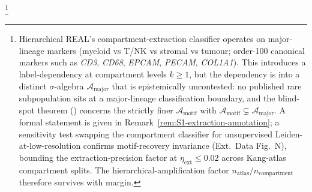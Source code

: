 
\footnote{
Hierarchical REAL's compartment-extraction classifier operates on major-lineage markers (myeloid vs T/NK vs stromal vs tumour; order-100 canonical markers such as \textit{CD3}, \textit{CD68}, \textit{EPCAM}, \textit{PECAM}, \textit{COL1A1}). This introduces a label-dependency at compartment levels $k \geq 1$, but the dependency is into a distinct $\sigma$-algebra $\mathcal{A}_{\text{major}}$ that is epistemically uncontested: no published rare subpopulation sits at a major-lineage classification boundary, and the blind-spot theorem () concerns the strictly finer $\mathcal{A}_{\text{motif}}$ with $\mathcal{A}_{\text{motif}} \subsetneq \mathcal{A}_{\text{major}}$. A formal statement is given in Remark~\ref{rem:S1-extraction-annotation}; a sensitivity test swapping the compartment classifier for unsupervised Leiden-at-low-resolution confirms motif-recovery invariance (Ext.\ Data Fig.~N), bounding the extraction-precision factor at $\eta_{\text{ext}} \leq 0.02$ across Kang-atlas compartment splits. The hierarchical-amplification factor $n_{\text{atlas}}/n_{\text{compartment}}$ therefore survives with margin.
}
